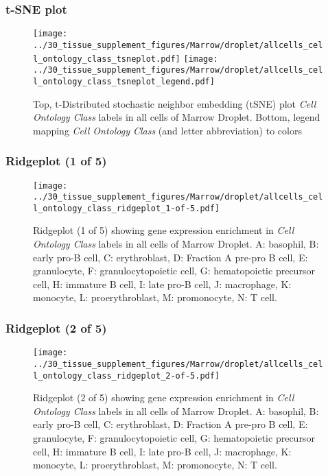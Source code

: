 \clearpage
\subsubsection{t-SNE plot}
\begin{figure}[h]
\centering
\texttt{[image: ../30\_tissue\_supplement\_figures/Marrow/droplet/allcells\_cell\_ontology\_class\_tsneplot.pdf]}
\texttt{[image: ../30\_tissue\_supplement\_figures/Marrow/droplet/allcells\_cell\_ontology\_class\_tsneplot\_legend.pdf]}
\caption{Top, t-Distributed stochastic neighbor embedding (tSNE) plot  \emph{Cell Ontology Class} labels in all cells of Marrow Droplet. Bottom, legend mapping \emph{Cell Ontology Class} (and letter abbreviation) to colors}
\end{figure}


\clearpage

\subsubsection{Ridgeplot (1 of 5)}
\begin{figure}[h]
\centering
\texttt{[image: ../30\_tissue\_supplement\_figures/Marrow/droplet/allcells\_cell\_ontology\_class\_ridgeplot\_1-of-5.pdf]}

\caption{ Ridgeplot (1 of 5)  showing gene expression enrichment in \emph{Cell Ontology Class} labels in all cells of Marrow Droplet. A: basophil, B: early pro-B cell, C: erythroblast, D: Fraction A pre-pro B cell, E: granulocyte, F: granulocytopoietic cell, G: hematopoietic precursor cell, H: immature B cell, I: late pro-B cell, J: macrophage, K: monocyte, L: proerythroblast, M: promonocyte, N: T cell.}
\end{figure}


\clearpage

\subsubsection{Ridgeplot (2 of 5)}
\begin{figure}[h]
\centering
\texttt{[image: ../30\_tissue\_supplement\_figures/Marrow/droplet/allcells\_cell\_ontology\_class\_ridgeplot\_2-of-5.pdf]}

\caption{ Ridgeplot (2 of 5)  showing gene expression enrichment in \emph{Cell Ontology Class} labels in all cells of Marrow Droplet. A: basophil, B: early pro-B cell, C: erythroblast, D: Fraction A pre-pro B cell, E: granulocyte, F: granulocytopoietic cell, G: hematopoietic precursor cell, H: immature B cell, I: late pro-B cell, J: macrophage, K: monocyte, L: proerythroblast, M: promonocyte, N: T cell.}
\end{figure}


